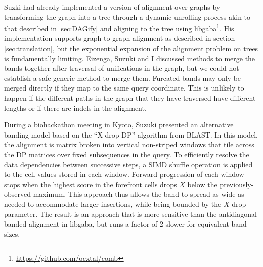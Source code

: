Suzki had already implemented a version of alignment over graphs by transforming the graph into a tree through a dynamic unrolling process akin to that described in \ref{sec:DAGify} and aligning to the tree using libgaba\footnote{\url{https://github.com/ocxtal/comb}}.
His implementation supports graph to graph alignment as described in section \ref{sec:translation}, but the exponential expansion of the alignment problem on trees is fundamentally limiting.
Eizenga, Suzuki and I discussed methods to merge the bands together after traversal of unifications in the graph, but we could not establish a safe generic method to merge them.
Furcated bands may only be merged directly if they map to the same query coordinate.
This is unlikely to happen if the different paths in the graph that they have traversed have different lengths or if there are indels in the alignment.

During a biohackathon meeting in Kyoto, Suzuki presented an alternative banding model based on the ``X-drop DP'' algorithm from BLAST.
In this model, the alignment is matrix broken into vertical non-striped windows that tile across the DP matrices over fixed subsequences in the query.
To efficiently resolve the data dependencies between successive steps, a SIMD shuffle operation is applied to the cell values stored in each window.
Forward progression of each window stops when the highest score in the forefront cells drops $X$ below the previously-observed maximum.
This approach thus allows the band to spread as wide as needed to accommodate larger insertions, while being bounded by the $X$-drop parameter.
The result is an approach that is more sensitive than the antidiagonal banded alignment in libgaba, but runs a factor of 2 slower for equivalent band sizes.

